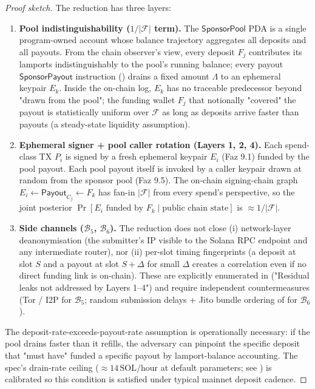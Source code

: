 \begin{proof}[Proof sketch]
The reduction has three layers:

\begin{enumerate}[leftmargin=2em,itemsep=0pt]
  \item \textbf{Pool indistinguishability ($1/|\mathcal{F}|$ term).}
    The $\mathsf{SponsorPool}$ PDA is a single program-owned account
    whose balance trajectory aggregates all deposits and all
    payouts. From the chain observer's view, every deposit
    $F_j$ contributes its lamports indistinguishably to the
    pool's running balance; every payout $\mathsf{SponsorPayout}$
    instruction () drains a
    fixed amount $\Lambda$ to an ephemeral keypair $E_k$. Inside
    the on-chain log, $E_k$ has no traceable predecessor beyond
    "drawn from the pool"; the funding wallet $F_j$ that
    notionally "covered" the payout is statistically uniform
    over $\mathcal{F}$ as long as deposits arrive faster than
    payouts (a steady-state liquidity assumption).

  \item \textbf{Ephemeral signer + pool caller rotation (Layers 1, 2, 4).}
    Each spend-class TX $P_i$ is signed by a fresh ephemeral
    keypair $E_i$ (Faz 9.1) funded by the pool payout. Each
    pool payout itself is invoked by a caller keypair drawn at
    random from the sponsor pool (Faz 9.5). The on-chain
    signing-chain graph
    $E_i \leftarrow \mathsf{Payout}_{C_j} \leftarrow F_k$
    has fan-in $|\mathcal{F}|$ from every spend's perspective,
    so the joint posterior $\Pr[E_i \text{ funded by } F_k \mid
    \text{public chain state}]$ is $\approx 1/|\mathcal{F}|$.

  \item \textbf{Side channels ($\mathcal{B}_5$, $\mathcal{B}_6$).}
    The reduction does not close (i) network-layer
    deanonymisation (the submitter's IP visible to the Solana
    RPC endpoint and any intermediate router), nor (ii) per-slot
    timing fingerprints (a deposit at slot $S$ and a payout at
    slot $S+\Delta$ for small $\Delta$ creates a correlation
    even if no direct funding link is on-chain). These are
    explicitly enumerated in
     ("Residual leaks not
    addressed by Layers 1--4") and require independent
    countermeasures (Tor / I2P for $\mathcal{B}_5$; random
    submission delays + Jito bundle ordering of
     for $\mathcal{B}_6$).
\end{enumerate}

The deposit-rate-exceeds-payout-rate assumption is operationally
necessary: if the pool drains faster than it refills, the
adversary can pinpoint the specific deposit that "must have"
funded a specific payout by lamport-balance accounting. The
spec's drain-rate ceiling
($\approx 14\,\mathrm{SOL/hour}$ at default parameters; see
) is calibrated so this
condition is satisfied under typical mainnet deposit cadence.
\end{proof}

